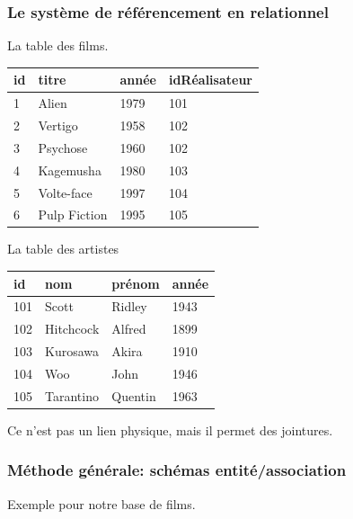  
\begin{frame}[fragile]
\frametitle{Le système de référencement en relationnel}

\alert{La table des films.}

\medskip

 \begin{small}
   \begin{tabular}[!ht]{l|l|l|l}
    \textbf{id} & \textbf{titre} & \textbf{année} & \textbf{idRéalisateur} \\
     \hline
    1 & Alien & 1979 & \alert{101} \\
    2 & Vertigo & 1958 & \alert{102}\\
    3 & Psychose & 1960 & \alert{102} \\
    4 & Kagemusha & 1980 & \alert{103} \\
    5 & Volte-face & 1997 & \alert{104} \\
    6 & Pulp Fiction & 1995 & \alert{105} \\
     \hline
   \end{tabular}
   \end{small}
 \medskip
 
\alert{La table des artistes}
\medskip

\begin{small}
   \begin{tabular}[!ht]{l|l|l|l}
    \textbf{id} & \textbf{nom} & \textbf{prénom} &  \textbf{année} \\
     \hline
    \alert{101} & Scott & Ridley & 1943 \\
    \alert{102} & Hitchcock & Alfred & 1899 \\
    \alert{103} & Kurosawa & Akira & 1910 \\
    \alert{104} & Woo & John & 1946 \\
    \alert{105} & Tarantino & Quentin & 1963 \\
     \hline
   \end{tabular}
\end{small}
\medskip

\alert{Ce n'est pas un lien physique, mais il permet des jointures.}

\end{frame}
 
 
\begin{frame}
\frametitle{Méthode générale: schémas entité/association}

Exemple pour notre base de films.

\vfill


\end{frame}


